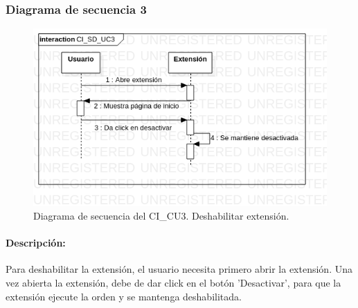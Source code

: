 \documentclass[12pt, a4paper, titlepage]{report}
\begin{document}
    			\subsubsection{Diagrama de secuencia 3}
    			    \begin{figure}[H]
    				    \begin{center} \includegraphics[width=15cm]{./imagenes/Disenio/Componente_1/CI_SD_UC3.png}
    				    \caption[Diagrama de secuencia 3 del Componente I]{Diagrama de secuencia del CI\_CU3. Deshabilitar extensión.}
    			        \end{center}
    			    \end{figure}
    			    
    			    \paragraph{Descripción:}
    			    Para deshabilitar la extensión, el usuario necesita primero abrir la extensión. Una vez abierta la extensión, debe de dar click en el botón 'Desactivar', para que la extensión ejecute la orden y se mantenga deshabilitada.
    			   
    			
\end{document}

